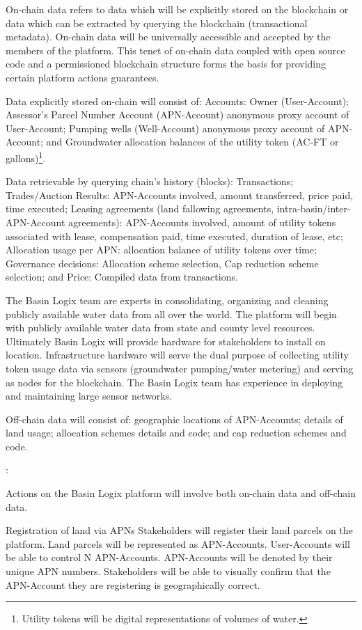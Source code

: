 \documentclass{tufte-handout}
\begin{document}
On-chain data refers to data which will be explicitly stored on the blockchain or data which can be extracted by querying the blockchain (transactional metadata). On-chain data will be universally accessible and accepted by the members of the platform. This tenet of on-chain data coupled with open source code and a permissioned blockchain structure forms the basis for providing certain platform actions guarantees.

Data explicitly stored on-chain will consist of: Accounts: Owner (User-Account); Assessor's Parcel Number Account (APN-Account) anonymous proxy account of User-Account; Pumping wells (Well-Account) anonymous proxy account of APN-Account; and Groundwater allocation balances of the utility token (AC-FT or gallons)\footnote{Utility tokens will be digital representations of volumes of water.}. 

Data retrievable by querying chain's history (blocks): Transactions; Trades/Auction Results: APN-Accounts involved, amount transferred, price paid, time executed; Leasing agreements (land fallowing agreements, intra-basin/inter-APN-Account agreements): APN-Accounts involved, amount of utility tokens associated with lease, compensation paid, time executed, duration of lease, etc; Allocation usage per APN: allocation balance of utility tokens over time; Governance decisions: Allocation scheme selection, Cap reduction scheme selection; and Price: Compiled data from transactions.

The Basin Logix team are experts in consolidating, organizing and cleaning publicly available water data from all over the world. The platform will begin with publicly available water data from state and county level resources. Ultimately Basin Logix will provide hardware for stakeholders to install on location. Infrastructure hardware will serve the dual purpose of collecting utility token usage data via sensors (groundwater pumping/water metering) and serving as nodes for the blockchain. The Basin Logix team has experience in deploying and maintaining large sensor networks.

Off-chain data will consist of: geographic locations of APN-Accounts; details of land usage; allocation schemes details and code; and cap reduction schemes and code.

:

	Actions on the Basin Logix platform will involve both on-chain data and off-chain data. \break 

Registration of land via APNs \break
Stakeholders will register their land parcels on the platform. Land parcels will be represented as APN-Accounts. User-Accounts will be able to control N APN-Accounts. APN-Accounts will be denoted by their unique APN numbers. Stakeholders will be able to visually confirm that the APN-Account they are registering is geographically correct. 
\end{document}
